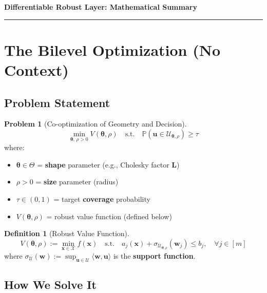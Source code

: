 \documentclass[11pt]{article}
\newcommand{\Prob}{\mathbb{P}}
\newcommand{\cU}{\mathcal{U}}
\newcommand{\cX}{\mathcal{X}}
\newcommand{\ip}[2]{\langle #1, #2 \rangle}
\newcommand{\btheta}{\bm{\theta}}
\newcommand{\bu}{\bm{u}}
\newcommand{\bx}{\bm{x}}
\newcommand{\bw}{\bm{w}}
\newcommand{\bL}{\bm{L}}
\theoremstyle{definition}
\newtheorem{problem}{Problem}
\newtheorem{definition}{Definition}
\begin{document}
\begin{center}
{\Large\bfseries Differentiable Robust Layer: Mathematical Summary}
\end{center}

\hrule
\vspace{1em}

\section{The Bilevel Optimization (No Context)}

\subsection{Problem Statement}

\begin{problem}[Co-optimization of Geometry and Decision]
\begin{equation}\label{eq:bilevel}
\boxed{
\min_{\btheta,\, \rho > 0} V(\btheta, \rho) \quad \text{s.t.} \quad \Prob(\bu \in \cU_{\btheta,\rho}) \ge \tau
}
\end{equation}
where:
\begin{itemize}[leftmargin=2em, itemsep=2pt]
\item $\btheta \in \Theta$ = \textbf{shape} parameter (e.g., Cholesky factor $\bL$)
\item $\rho > 0$ = \textbf{size} parameter (radius)
\item $\tau \in (0,1)$ = target \textbf{coverage} probability
\item $V(\btheta,\rho)$ = robust value function (defined below)
\end{itemize}
\end{problem}

\begin{definition}[Robust Value Function]
\begin{equation}\label{eq:value-function}
V(\btheta,\rho) := \min_{\bx \in \cX} f(\bx) \quad \text{s.t.} \quad a_j(\bx) + \sigma_{\cU_{\btheta,\rho}}(\bw_j) \le b_j, \quad \forall j \in [m]
\end{equation}
where $\sigma_{\cU}(\bw) := \sup_{\bu \in \cU} \ip{\bw}{\bu}$ is the \textbf{support function}.
\end{definition}


\subsection{How We Solve It}
\end{document}
